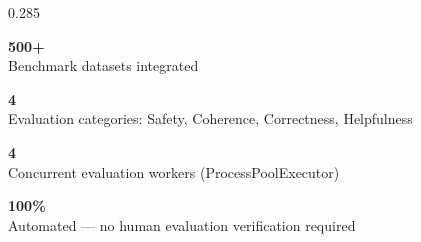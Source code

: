 \documentclass[final]{beamer}
\begin{document}
\begin{frame}[t]
\begin{columns}[T,totalwidth=\linewidth]
\begin{column}{0.285\linewidth}
  \begin{tcolorbox}[sectionbox,title={What We Built}]
    \begin{tcolorbox}[statbox]
      \centering
      {\color{evalgreenLight}\fontsize{32}{36}\selectfont\textbf{500+}}\\
      {\color{white}\fontsize{16}{20}\selectfont Benchmark datasets integrated}
    \end{tcolorbox}
    \vspace{0.3cm}
    \begin{tcolorbox}[statbox]
      \centering
      {\color{evalgreenLight}\fontsize{32}{36}\selectfont\textbf{4}}\\
      {\color{white}\fontsize{16}{20}\selectfont Evaluation categories: Safety, Coherence, Correctness, Helpfulness}
    \end{tcolorbox}
    \vspace{0.3cm}
    \begin{tcolorbox}[statbox]
      \centering
      {\color{evalgreenLight}\fontsize{32}{36}\selectfont\textbf{4}}\\
      {\color{white}\fontsize{16}{20}\selectfont Concurrent evaluation workers (ProcessPoolExecutor)}
    \end{tcolorbox}
    \vspace{0.3cm}
    \begin{tcolorbox}[statbox]
      \centering
      {\color{evalgreenLight}\fontsize{32}{36}\selectfont\textbf{100\%}}\\
      {\color{white}\fontsize{16}{20}\selectfont Automated --- no human evaluation verification required}
    \end{tcolorbox}
  \end{tcolorbox}

\end{column}

\end{columns}

\end{frame}
\end{document}
